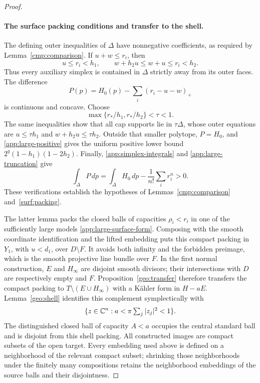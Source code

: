 \begin{proof}
\paragraph{The surface packing conditions and transfer to the shell.}
The defining outer inequalities of $\Delta$ have nonnegative coefficients,
as required by Lemma~\ref{cmp:comparison}. If $u+w\le r_i$, then
\[
 u\le r_i<h_1,\qquad
 w+h_2u\le w+u\le r_i<h_2.
\]
Thus every auxiliary simplex is contained in $\Delta$ strictly away from
its outer faces. The difference
\[
 P(p)=H_0(p)-\sum_i(r_i-u-w)_+
\]
is continuous and concave. Choose
\[
 \max\{r_*/h_1,r_*/h_2\}<\tau<1.
\]
The same inequalities show that all cap supports lie in $\tau\Delta$,
whose outer equations are $u\le\tau h_1$ and
$w+h_2u\le\tau h_2$. Outside that smaller polytope, $P=H_0$, and
\eqref{app:large-positive} gives the uniform positive lower bound
$2^q(1-h_1)(1-2h_2)$. Finally,
\eqref{app:simplex-integrals} and \eqref{app:large-truncation} give
\[
 \int_\Delta P\,dp
 =\int_\Delta H_0\,dp-\frac1{n!}\sum_i r_i^n>0.
\]
These verifications establish the hypotheses of
Lemmas~\ref{cmp:comparison} and~\ref{surf:packing}.

The latter lemma packs the closed balls of capacities $\rho_i<r_i$ in one
of the sufficiently large models \eqref{app:large-surface-form}. Composing
with the smooth coordinate identification and the lifted embedding puts
this compact packing in $Y_1$, with $u<d_1$, over $D\setminus F$.
It avoids both infinity and the forbidden preimage, which is the smooth
projective line bundle over $F$. In the first normal construction,
$E$ and $H_\infty$ are disjoint smooth divisors; their intersections with
$D$ are respectively empty and $F$. Proposition~\ref{geo:transfer}
therefore transfers the compact packing to
$T\setminus(E\cup H_\infty)$ with a K\"ahler form in $H-aE$.
Lemma~\ref{geo:shell} identifies this complement symplectically with
\[
 \{z\in\mathbb C^n:a<\pi\textstyle\sum_j|z_j|^2<1\}.
\]
The distinguished closed ball of capacity $A<a$ occupies the central
standard ball and is disjoint from this shell packing. All constructed
images are compact subsets of the open target. Every embedding used above
is defined on a neighborhood of the relevant compact subset; shrinking
those neighborhoods under the finitely many compositions retains the
neighborhood embeddings of the source balls and their disjointness.
\end{proof}
